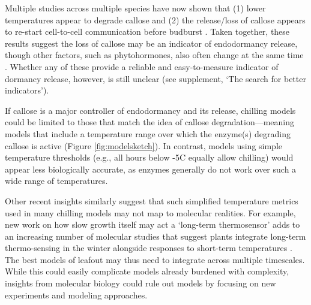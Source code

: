 \documentclass[11pt]{article}
\begin{document}
Multiple studies across multiple species have now shown that (1) lower temperatures appear to degrade callose and (2) the release/loss of callose appears to re-start cell-to-cell communication before budburst \citep{vanderschoot2014,pandey2026variable}. Taken together, these results suggest the loss of callose may be an indicator of endodormancy release, though other factors, such as  phytohormones, also often change at the same time \citep[][]{rinne2018,tylewicz2018photoperiodic,pan2021aba,andre2022populus}. Whether any of these provide a reliable and easy-to-measure indicator of dormancy release, however, is still unclear (see supplement, `The search for better indicators').



If callose is a major controller of endodormancy and its release, chilling models could be limited to those that match the idea of callose degradation---meaning models that include a temperature range over which the enzyme(s) degrading callose is active (Figure \ref{fig:modelsketch}). In contrast, models using simple temperature thresholds (e.g., all hours below -5\degree C equally allow chilling) would appear less biologically accurate, as enzymes generally do not work over such a wide range of temperatures. 

Other recent insights similarly suggest that such simplified temperature metrics used in many chilling models may not map to molecular realities. For example, new work on how slow growth itself may act  a `long-term thermosensor' \citep{zhao2020temperature} 
adds to an increasing number of molecular studies that suggest plants integrate long-term thermo-sensing in the winter alongside responses to short-term temperatures \citep{antoniou2021feeling,Satake2022}. The best models of leafout may thus need to integrate across multiple timescales. While this could easily complicate models already burdened with complexity, insights from molecular biology could rule out models by focusing on new experiments and modeling approaches. 
\end{document}
